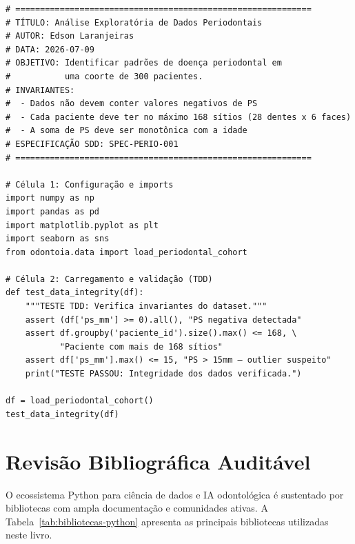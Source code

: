 \begin{verbatim}
# ============================================================
# TÍTULO: Análise Exploratória de Dados Periodontais
# AUTOR: Edson Laranjeiras
# DATA: 2026-07-09
# OBJETIVO: Identificar padrões de doença periodontal em
#           uma coorte de 300 pacientes.
# INVARIANTES:
#  - Dados não devem conter valores negativos de PS
#  - Cada paciente deve ter no máximo 168 sítios (28 dentes x 6 faces)
#  - A soma de PS deve ser monotônica com a idade
# ESPECIFICAÇÃO SDD: SPEC-PERIO-001
# ============================================================

# Célula 1: Configuração e imports
import numpy as np
import pandas as pd
import matplotlib.pyplot as plt
import seaborn as sns
from odontoia.data import load_periodontal_cohort

# Célula 2: Carregamento e validação (TDD)
def test_data_integrity(df):
    """TESTE TDD: Verifica invariantes do dataset."""
    assert (df['ps_mm'] >= 0).all(), "PS negativa detectada"
    assert df.groupby('paciente_id').size().max() <= 168, \
           "Paciente com mais de 168 sítios"
    assert df['ps_mm'].max() <= 15, "PS > 15mm — outlier suspeito"
    print("TESTE PASSOU: Integridade dos dados verificada.")

df = load_periodontal_cohort()
test_data_integrity(df)
\end{verbatim}

\section{Revisão Bibliográfica Auditável}

O ecossistema Python para ciência de dados e IA odontológica é sustentado por bibliotecas com ampla documentação e comunidades ativas. A Tabela~\ref{tab:bibliotecas-python} apresenta as principais bibliotecas utilizadas neste livro.

